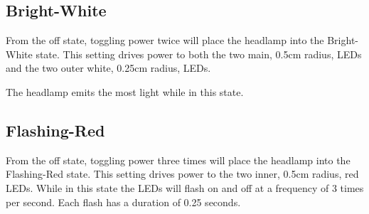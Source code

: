 \documentclass[12pt]{article}
\begin{document}
\subsection{Bright-White}
From the off state, toggling power twice will place the headlamp into the Bright-White state.  This
setting drives power to both the two main, 0.5cm radius, LEDs and the two outer white, 0.25cm radius, LEDs.

The headlamp emits the most light while in this state.

\subsection{Flashing-Red}
From the off state, toggling power three times will place the headlamp into the Flashing-Red state.
This setting drives power to the two inner, 0.5cm radius, red LEDs. While in this state the
LEDs will flash on and off at a frequency of 3 times per second. Each flash has a duration of
0.25 seconds.
\end{document}
